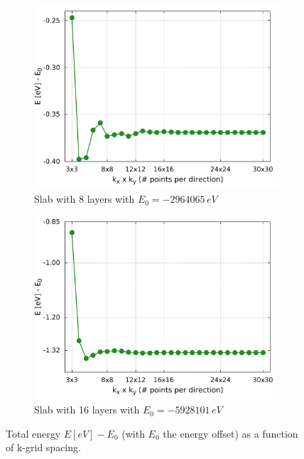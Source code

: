 \begin{figure}[b!]
	\begin{subfigure}[c]{.5\linewidth}
		\centering
		\includegraphics[width=\linewidth]{andere_bilder/kgrid_1x1x8_layers.pdf}
		\caption{Slab with 8 layers with $E_0= -2964065 \,\unit{eV}$} \label{k_grid_3}
	\end{subfigure}
	\hfill
	\begin{subfigure}[c]{.5\linewidth}
		\centering
		\includegraphics[width=\linewidth]{andere_bilder/kgrid_1x1x16_layers.pdf}
		\caption{Slab with 16 layers with $E_0= -5928101 \,\unit{eV}$} \label{k_grid_4}
	\end{subfigure}
	\caption{Total energy $E [\unit{eV}] - E_0$ (with $E_0$ the energy offset) as a function of k-grid spacing.} \label{k_grid_study}
\end{figure}

\FloatBarrier	
